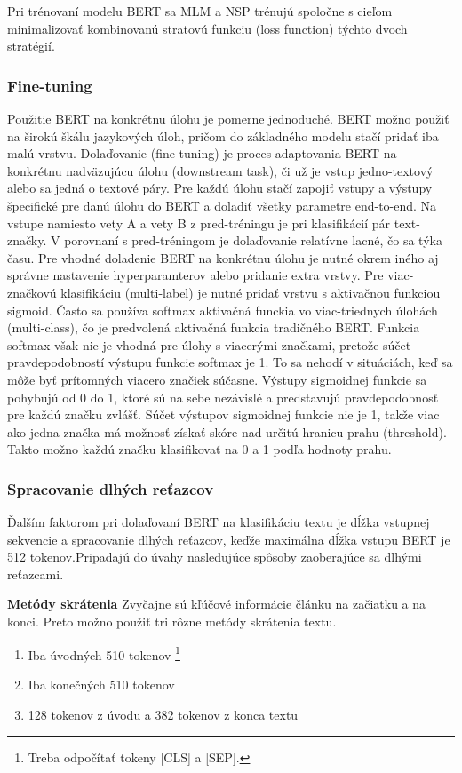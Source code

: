 Pri trénovaní modelu BERT sa MLM a NSP trénujú spoločne s cieľom minimalizovať kombinovanú stratovú funkciu (loss function) týchto dvoch stratégií. \cite{Horev:2019} \cite{Sun:2019} 

\subsubsection*{Fine-tuning}

Použitie BERT na konkrétnu úlohu je pomerne jednoduché. BERT možno použiť na širokú škálu jazykových úloh, pričom do základného modelu stačí pridať iba malú vrstvu. Dolaďovanie (fine-tuning) je proces adaptovania BERT na konkrétnu nadväzujúcu úlohu (downstream task), či už je vstup jedno-textový alebo sa jedná o textové páry. Pre každú úlohu stačí zapojiť vstupy a výstupy špecifické pre danú úlohu do BERT a doladiť všetky parametre end-to-end. Na vstupe namiesto vety A a vety B z pred-tréningu je pri klasifikácií pár text-značky. V porovnaní s pred-tréningom je dolaďovanie relatívne lacné, čo sa týka času. 
Pre vhodné doladenie BERT na konkrétnu úlohu je nutné okrem iného aj správne nastavenie hyperparamterov alebo pridanie extra vrstvy. Pre viac-značkovú klasifikáciu (multi-label) je nutné pridať vrstvu s aktivačnou funkciou sigmoid. Často sa používa softmax aktivačná funckia vo viac-triednych  úlohách (multi-class), čo je predvolená aktivačná funkcia tradičného BERT. Funkcia softmax však nie je vhodná pre úlohy s viacerými značkami, pretože súčet pravdepodobností výstupu funkcie softmax je 1. To sa nehodí v situáciách, keď sa môže byť prítomných viacero značiek súčasne.  Výstupy sigmoidnej funkcie sa pohybujú od 0 do 1, ktoré sú na sebe nezávislé a predstavujú pravdepodobnosť pre každú značku zvlášť. Súčet výstupov sigmoidnej funkcie nie je 1, takže viac ako jedna značka má možnosť získať skóre nad určitú hranicu prahu (threshold). Takto možno každú značku klasifikovať na 0 a 1 podľa hodnoty prahu.
\cite{Devlin:2018} \cite{Sun:2019} \cite{Tang:2020}

\subsubsection*{Spracovanie dlhých reťazcov}

Ďalším faktorom pri dolaďovaní BERT na klasifikáciu textu je dĺžka vstupnej sekvencie a spracovanie dlhých reťazcov, keďže maximálna dĺžka vstupu BERT je 512 tokenov.Pripadajú do úvahy nasledujúce spôsoby zaoberajúce sa dlhými reťazcami.

\textbf{Metódy skrátenia} Zvyčajne sú kľúčové informácie článku na začiatku a na konci. Preto možno použiť tri rôzne metódy skrátenia textu.
\begin{enumerate}
    \item Iba úvodných 510 tokenov \footnote{Treba odpočítať tokeny [CLS] a [SEP].}
    \item Iba konečných 510 tokenov
    \item 128 tokenov z úvodu a 382 tokenov z konca textu
\end{enumerate}

